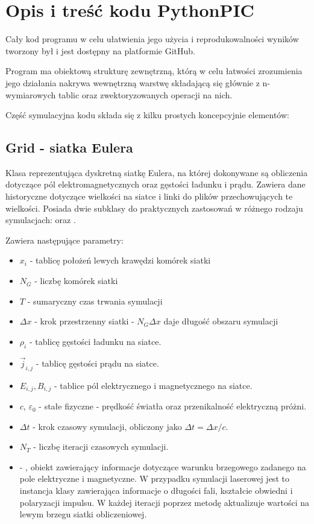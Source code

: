 \section{Opis i treść kodu PythonPIC}
Cały kod programu w celu ułatwienia jego użycia i reprodukowalności wyników tworzony był i jest
dostępny na platformie GitHub\cite{github-repo}.

Program ma obiektową strukturę zewnętrzną, którą w celu łatwości
zrozumienia jego działania nakrywa wewnętrzną warstwę składającą się
głównie z n-wymiarowych tablic  oraz zwektoryzowanych
operacji na nich.

Część symulacyjna kodu składa się z kilku prostych koncepcyjnie elementów:

\subsection{Grid - siatka Eulera}
Klasa reprezentująca dyskretną siatkę Eulera, na której dokonywane są
obliczenia dotyczące pól elektromagnetycznych oraz gęstości ładunku i
prądu. Zawiera dane historyczne dotyczące wielkości na siatce
i linki do plików  przechowujących te wielkości.
Posiada dwie subklasy do praktycznych zastosowań w różnego rodzaju
symulacjach:  oraz .

Zawiera następujące parametry:
\begin{itemize}
    \item $x_i$ - tablicę położeń lewych krawędzi komórek siatki
    \item $N_G$ - liczbę komórek siatki
    \item $T$ - sumaryczny czas trwania symulacji
    \item $\Delta x$ - krok przestrzenny siatki - $N_G \Delta x$ daje
        długość obszaru symulacji
    \item $\rho_i$ - tablicę gęstości ładunku na siatce.
    \item $\vec{j}_{i,j}$ - tablicę gęstości prądu na siatce.
    \item $E_{i,j}, B_{i,j}$ - tablice pól elektrycznego i magnetycznego na siatce.
    \item $c$, $\varepsilon_0$ - stałe fizyczne - prędkość światła oraz
        przenikalność elektryczną próżni.
    \item $\Delta t$ - krok czasowy symulacji, obliczony jako $\Delta t =
        \Delta x / c$.
    \item $N_T$ - liczbę iteracji czasowych symulacji.
    \item {} - , obiekt zawierający informacje dotyczące
        warunku brzegowego zadanego na pole elektryczne i magnetyczne. W przypadku symulacji
        laserowej jest to instancja klasy  zawierająca informacje o
        długości fali, kształcie obwiedni
        i polaryzacji impulsu. W każdej iteracji  poprzez metodę
         aktualizuje wartości na lewym brzegu siatki obliczeniowej.
\end{itemize}

